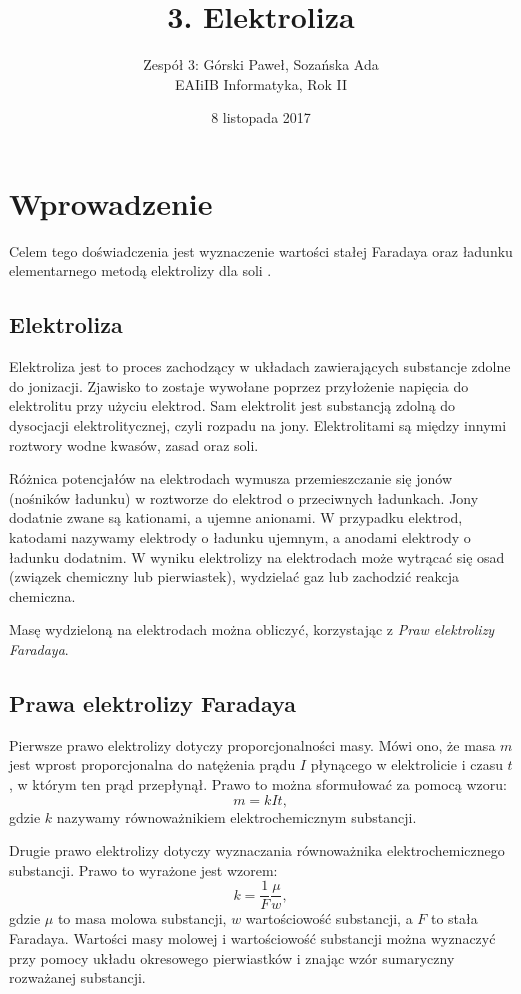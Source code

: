 \documentclass[12pt,a4paper]{article}
\title{3. Elektroliza}
\date{8 listopada 2017}
\author{
	Zespół 3: Górski Paweł, Sozańska Ada\\
	EAIiIB Informatyka, Rok II
}
\numberwithin{equation}{section}
\begin{document}
\maketitle
\section{Wprowadzenie}
Celem tego doświadczenia jest wyznaczenie wartości stałej Faradaya oraz ładunku elementarnego metodą elektrolizy dla soli .

\subsection{Elektroliza}

Elektroliza jest to proces zachodzący w układach zawierających substancje zdolne do jonizacji. Zjawisko to zostaje wywołane poprzez przyłożenie napięcia do elektrolitu przy użyciu elektrod. Sam elektrolit jest substancją zdolną do dysocjacji elektrolitycznej, czyli rozpadu na jony. Elektrolitami są między innymi roztwory wodne kwasów, zasad oraz soli. 

Różnica potencjałów na elektrodach wymusza przemieszczanie się jonów (nośników ładunku) w roztworze do elektrod o przeciwnych ładunkach. Jony dodatnie zwane są kationami, a ujemne anionami. W przypadku elektrod, katodami nazywamy elektrody o ładunku ujemnym, a anodami elektrody o ładunku dodatnim. W wyniku elektrolizy na elektrodach może wytrącać się osad (związek chemiczny lub pierwiastek), wydzielać gaz lub zachodzić reakcja chemiczna.

Masę wydzieloną na elektrodach można obliczyć, korzystając z \textit{Praw elektrolizy Faradaya}.

\subsection{Prawa elektrolizy Faradaya}

Pierwsze prawo elektrolizy dotyczy proporcjonalności masy. Mówi ono, że masa $m$ jest wprost proporcjonalna do natężenia prądu $I$ płynącego w elektrolicie i czasu $t$, w którym ten prąd przepłynął. Prawo to można sformułować za pomocą wzoru:
\begin{equation}
	m = kIt,
	\label{eq:faraday1}
\end{equation}
gdzie $k$ nazywamy równoważnikiem elektrochemicznym substancji.

Drugie prawo elektrolizy dotyczy wyznaczania równoważnika elektrochemicznego substancji. Prawo to wyrażone jest wzorem:
\begin{equation}
	k = \frac{1}{F}\frac{\mu}{w},
	\label{eq:faraday2}
\end{equation}
gdzie $\mu$ to masa molowa substancji, $w$ wartościowość substancji, a $F$ to stała Faradaya. Wartości masy molowej i wartościowość substancji można wyznaczyć przy pomocy układu okresowego pierwiastków i znając wzór sumaryczny rozważanej substancji.
\end{document}
